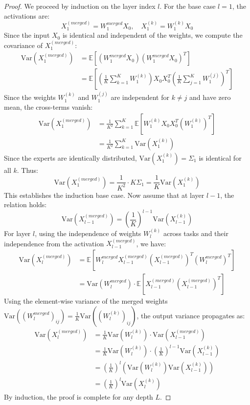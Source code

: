 \documentclass{article}
\theoremstyle{plain}
\theoremstyle{definition}
\theoremstyle{remark}
\begin{document}
\begin{proof}
We proceed by induction on the layer index $l$.
For the base case $l=1$, the activations are:
\begin{equation}
X_1^{(merged)} = W_1^{merged} X_0, \quad X_1^{(k)} = W_1^{(k)} X_0
\end{equation}
Since the input $X_0$ is identical and independent of the weights, we compute the covariance of $X_1^{(merged)}$:
\begin{align}
\text{Var}(X_1^{(merged)}) &= \mathbb{E}[ (W_1^{merged} X_0) (W_1^{merged} X_0)^T ] \\
&= \mathbb{E}\left[ \left(\frac{1}{K} \sum_{k=1}^K W_1^{(k)}\right) X_0 X_0^T \left(\frac{1}{K} \sum_{j=1}^K W_1^{(j)}\right)^T \right]
\end{align}
Since the weights $W_1^{(k)}$ and $W_1^{(j)}$ are independent for $k \neq j$ and have zero mean, the cross-terms vanish:
\begin{align}
\text{Var}(X_1^{(merged)}) &= \frac{1}{K^2} \sum_{k=1}^K \mathbb{E}[ W_1^{(k)} X_0 X_0^T (W_1^{(k)})^T ] \\
&= \frac{1}{K^2} \sum_{k=1}^K \text{Var}(X_1^{(k)})
\end{align}
Since the experts are identically distributed, $\text{Var}(X_1^{(k)}) = \Sigma_1$ is identical for all $k$. Thus:
\begin{equation}
\text{Var}(X_1^{(merged)}) = \frac{1}{K^2} \cdot K \Sigma_1 = \frac{1}{K} \text{Var}(X_1^{(k)})
\end{equation}
This establishes the induction base case. Now assume that at layer $l-1$, the relation holds:
\begin{equation}
\text{Var}(X_{l-1}^{(merged)}) = \left(\frac{1}{K}\right)^{l-1} \text{Var}(X_{l-1}^{(k)})
\end{equation}
For layer $l$, using the independence of weights $W_l^{(k)}$ across tasks and their independence from the activation $X_{l-1}^{(merged)}$, we have:
\begin{align}
\text{Var}(X_l^{(merged)}) &= \mathbb{E}[ W_l^{merged} X_{l-1}^{(merged)} (X_{l-1}^{(merged)})^T (W_l^{merged})^T ] \\
&= \text{Var}(W_l^{merged}) \cdot \mathbb{E}[ X_{l-1}^{(merged)} (X_{l-1}^{(merged)})^T ]
\end{align}
Using the element-wise variance of the merged weights $\text{Var}((W_l^{merged})_{ij}) = \frac{1}{K} \text{Var}((W_l^{(k)})_{ij})$, the output variance propagates as:
\begin{align}
\text{Var}(X_l^{(merged)}) &= \frac{1}{K} \text{Var}(W_l^{(k)}) \cdot \text{Var}(X_{l-1}^{(merged)}) \\
&= \frac{1}{K} \text{Var}(W_l^{(k)}) \cdot \left(\frac{1}{K}\right)^{l-1} \text{Var}(X_{l-1}^{(k)}) \\
&= \left(\frac{1}{K}\right)^l \left( \text{Var}(W_l^{(k)}) \text{Var}(X_{l-1}^{(k)}) \right) \\
&= \left(\frac{1}{K}\right)^l \text{Var}(X_l^{(k)})
\end{align}
By induction, the proof is complete for any depth $L$.
\end{proof}
\end{document}
